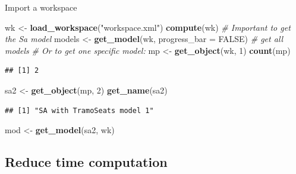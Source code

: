\documentclass[10pt,xcolor=table,color={dvipsnames,usenames},ignorenonframetext,usepdftitle=false,french]{beamer}
\newenvironment{Shaded}{\begin{snugshade}}{\end{snugshade}}
\newcommand{\CommentTok}[1]{\textcolor[rgb]{0.56,0.35,0.01}{\textit{#1}}}
\newcommand{\DataTypeTok}[1]{\textcolor[rgb]{0.13,0.29,0.53}{#1}}
\newcommand{\DecValTok}[1]{\textcolor[rgb]{0.00,0.00,0.81}{#1}}
\newcommand{\KeywordTok}[1]{\textcolor[rgb]{0.13,0.29,0.53}{\textbf{#1}}}
\newcommand{\NormalTok}[1]{#1}
\newcommand{\OtherTok}[1]{\textcolor[rgb]{0.56,0.35,0.01}{#1}}
\newcommand{\StringTok}[1]{\textcolor[rgb]{0.31,0.60,0.02}{#1}}
\begin{document}
\begin{frame}[fragile]{Import a workspace}
\protect\hypertarget{import-a-workspace}{}

\footnotesize

\begin{Shaded}
\begin{Highlighting}[]
\NormalTok{wk <-}\StringTok{ }\KeywordTok{load_workspace}\NormalTok{(}\StringTok{"workspace.xml"}\NormalTok{)}
\KeywordTok{compute}\NormalTok{(wk) }\CommentTok{# Important to get the Sa model}
\NormalTok{models <-}\StringTok{ }\KeywordTok{get_model}\NormalTok{(wk, }\DataTypeTok{progress_bar =} \OtherTok{FALSE}\NormalTok{) }\CommentTok{# get all models}
\CommentTok{# Or to get one specific model:}
\NormalTok{mp <-}\StringTok{ }\KeywordTok{get_object}\NormalTok{(wk, }\DecValTok{1}\NormalTok{)}
\KeywordTok{count}\NormalTok{(mp)}
\end{Highlighting}
\end{Shaded}

\begin{verbatim}
## [1] 2
\end{verbatim}

\begin{Shaded}
\begin{Highlighting}[]
\NormalTok{sa2 <-}\StringTok{ }\KeywordTok{get_object}\NormalTok{(mp, }\DecValTok{2}\NormalTok{)}
\KeywordTok{get_name}\NormalTok{(sa2)}
\end{Highlighting}
\end{Shaded}

\begin{verbatim}
## [1] "SA with TramoSeats model 1"
\end{verbatim}

\begin{Shaded}
\begin{Highlighting}[]
\NormalTok{mod <-}\StringTok{ }\KeywordTok{get_model}\NormalTok{(sa2, wk)}
\end{Highlighting}
\end{Shaded}

\end{frame}

\hypertarget{reduce-time-computation}{%
\subsection{Reduce time computation}\label{reduce-time-computation}}
\end{document}
